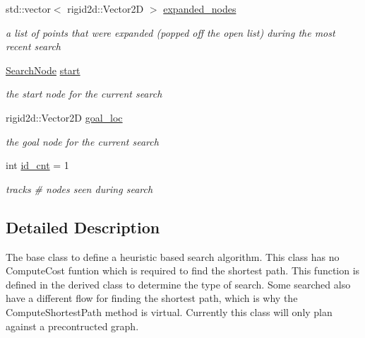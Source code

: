 \begin{DoxyCompactItemize}
std\+::vector$<$ rigid2d\+::\+Vector2D $>$ \hyperlink{classhsearch_1_1HSearch_a1c457adbfabaf7ff5f07fef685369991}{expanded\+\_\+nodes}
\begin{DoxyCompactList}\small\item\em a list of points that were expanded (popped off the open list) during the most recent search \end{DoxyCompactList}\item 
\mbox{\label{classhsearch_1_1HSearch_a8eedd2e1bd6e1d889fdd50e5fa53ad01}} 
\hyperlink{structhsearch_1_1SearchNode}{Search\+Node} \hyperlink{classhsearch_1_1HSearch_a8eedd2e1bd6e1d889fdd50e5fa53ad01}{start}
\begin{DoxyCompactList}\small\item\em the start node for the current search \end{DoxyCompactList}\item 
\mbox{\label{classhsearch_1_1HSearch_a201d281d6a8d9fcc4158772f862d1847}} 
rigid2d\+::\+Vector2D \hyperlink{classhsearch_1_1HSearch_a201d281d6a8d9fcc4158772f862d1847}{goal\+\_\+loc}
\begin{DoxyCompactList}\small\item\em the goal node for the current search \end{DoxyCompactList}\item 
\mbox{\label{classhsearch_1_1HSearch_a3b741554035ca11f6db86bb14ee329c6}} 
int \hyperlink{classhsearch_1_1HSearch_a3b741554035ca11f6db86bb14ee329c6}{id\+\_\+cnt} = 1
\begin{DoxyCompactList}\small\item\em tracks \# nodes seen during search \end{DoxyCompactList}\end{DoxyCompactItemize}


\subsection{Detailed Description}
The base class to define a heuristic based search algorithm. This class has no Compute\+Cost funtion which is required to find the shortest path. This function is defined in the derived class to determine the type of search. Some searched also have a different flow for finding the shortest path, which is why the Compute\+Shortest\+Path method is virtual. Currently this class will only plan against a precontructed graph. 

